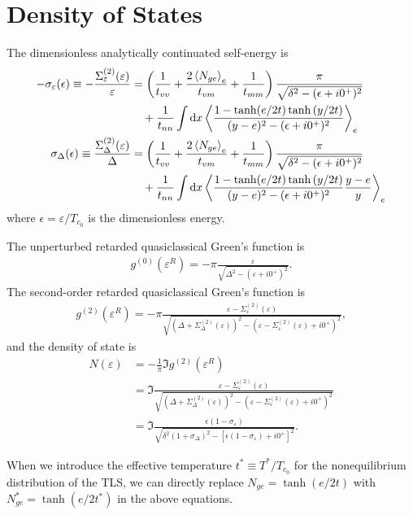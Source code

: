 \documentclass[aps,prl,preprint]{revtex4-2}
\begin{document}
\section{Density of States}

The dimensionless analytically continuated self-energy is
\begin{align}
    - \sigma_\varepsilon(\epsilon) \equiv -\frac{\Sigma^{(2)}_\varepsilon(\varepsilon)}{\varepsilon} & = \left(\frac{1}{t_{vv}} + \frac{2\ev{N_{ge}}_e}{t_{vm}} + \frac{1}{t_{mm}}\right)\frac{\pi}{\sqrt{\delta^2 - (\epsilon+i0^+)^2}} \nonumber \\
                                                                                                     & \quad + \frac{1}{t_{nn}}\int\dd x\ev{\frac{1-\tanh(e/2t)\tanh{(y/2t)}}{(y-e)^2 - (\epsilon+i0^+)^2}}_e \nonumber                            \\
    \sigma_\Delta(\epsilon) \equiv \frac{\Sigma^{(2)}_\Delta(\varepsilon)}{\Delta}                   & = \left(\frac{1}{t_{vv}} + \frac{2\ev{N_{ge}}_e}{t_{vm}} + \frac{1}{t_{mm}}\right)\frac{\pi}{\sqrt{\delta^2 - (\epsilon+i0^+)^2}} \nonumber \\
                                                                                                     & \quad + \frac{1}{t_{nn}}\int\dd x\ev{\frac{1-\tanh(e/2t)\tanh{(y/2t)}}{(y-e)^2 - (\epsilon+i0^+)^2}\frac{y-e}{y}}_e \nonumber               \\
\end{align}
where $\epsilon = \varepsilon / T_{c_0}$ is the dimensionless energy.

The unperturbed retarded quasiclassical Green's function is
\begin{align}
    g^{(0)}(\varepsilon^R)
    = -\pi\frac{\varepsilon}
    {\sqrt{\Delta^2 - (\varepsilon+i0^+)^2}}.
\end{align}
The second-order retarded quasiclassical Green's function is
\begin{align}
    g^{(2)}(\varepsilon^R)
    = -\pi\frac{\varepsilon - \Sigma^{(2)}_\varepsilon(\varepsilon)}
    {\sqrt{(\Delta + \Sigma^{(2)}_\Delta(\varepsilon))^2
            - (\varepsilon - \Sigma^{(2)}_\varepsilon(\varepsilon) + i0^+)^2}},
\end{align}
and the density of state is
\begin{align}
    N(\varepsilon)
     & = -\frac{1}{\pi}\Im{g^{(2)}(\varepsilon^R)}                                                                                   \\
     & = \Im{\frac{\varepsilon - \Sigma^{(2)}_\varepsilon(\varepsilon)}
        {\sqrt{(\Delta + \Sigma^{(2)}_\Delta(\varepsilon))^2
                - (\varepsilon - \Sigma^{(2)}_\varepsilon(\varepsilon) + i0^+)^2}}}                                                  \\
     & = \Im{\frac{\epsilon(1-\sigma_\varepsilon)}{\sqrt{\delta^2(1+\sigma_\Delta)^2 - [\epsilon(1-\sigma_\varepsilon) + i0^+]^2}}}.
\end{align}

When we introduce the effective temperature $t^* \equiv T^*/T_{c_0}$ for the nonequilibrium distribution of the TLS,
we can directly replace $N_{ge} = \tanh(e/2t)$
with $N_{ge}^* = \tanh(e/2t^*)$ in the above equations.
\end{document}
